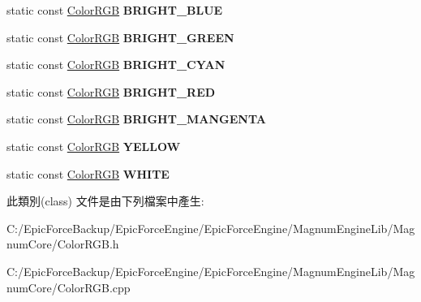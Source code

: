 \begin{DoxyCompactItemize}
\item 
static const \hyperlink{class_magnum_1_1_color_r_g_b}{Color\+R\+GB} {\bfseries B\+R\+I\+G\+H\+T\+\_\+\+B\+L\+UE}\hypertarget{class_magnum_1_1_color_r_g_b_a6963cc027e3faf280f7e26d610ee9c2c}{}\label{class_magnum_1_1_color_r_g_b_a6963cc027e3faf280f7e26d610ee9c2c}

\item 
static const \hyperlink{class_magnum_1_1_color_r_g_b}{Color\+R\+GB} {\bfseries B\+R\+I\+G\+H\+T\+\_\+\+G\+R\+E\+EN}\hypertarget{class_magnum_1_1_color_r_g_b_abf0acc88127121f7d3f23faf6164954d}{}\label{class_magnum_1_1_color_r_g_b_abf0acc88127121f7d3f23faf6164954d}

\item 
static const \hyperlink{class_magnum_1_1_color_r_g_b}{Color\+R\+GB} {\bfseries B\+R\+I\+G\+H\+T\+\_\+\+C\+Y\+AN}\hypertarget{class_magnum_1_1_color_r_g_b_aca190837015a9e2c805c86a6b8b94548}{}\label{class_magnum_1_1_color_r_g_b_aca190837015a9e2c805c86a6b8b94548}

\item 
static const \hyperlink{class_magnum_1_1_color_r_g_b}{Color\+R\+GB} {\bfseries B\+R\+I\+G\+H\+T\+\_\+\+R\+ED}\hypertarget{class_magnum_1_1_color_r_g_b_a0285b4b91cd28b7f32103416a2462807}{}\label{class_magnum_1_1_color_r_g_b_a0285b4b91cd28b7f32103416a2462807}

\item 
static const \hyperlink{class_magnum_1_1_color_r_g_b}{Color\+R\+GB} {\bfseries B\+R\+I\+G\+H\+T\+\_\+\+M\+A\+N\+G\+E\+N\+TA}\hypertarget{class_magnum_1_1_color_r_g_b_abd8bc1d6549782f2f5aca48c37c8e366}{}\label{class_magnum_1_1_color_r_g_b_abd8bc1d6549782f2f5aca48c37c8e366}

\item 
static const \hyperlink{class_magnum_1_1_color_r_g_b}{Color\+R\+GB} {\bfseries Y\+E\+L\+L\+OW}\hypertarget{class_magnum_1_1_color_r_g_b_a9d1c294a272f2d0c4275492fbb6e5fb6}{}\label{class_magnum_1_1_color_r_g_b_a9d1c294a272f2d0c4275492fbb6e5fb6}

\item 
static const \hyperlink{class_magnum_1_1_color_r_g_b}{Color\+R\+GB} {\bfseries W\+H\+I\+TE}\hypertarget{class_magnum_1_1_color_r_g_b_a0303d32467754d1c04d4c5b7e1d2de1a}{}\label{class_magnum_1_1_color_r_g_b_a0303d32467754d1c04d4c5b7e1d2de1a}

\end{DoxyCompactItemize}


此類別(class) 文件是由下列檔案中產生\+:\begin{DoxyCompactItemize}
\item 
C\+:/\+Epic\+Force\+Backup/\+Epic\+Force\+Engine/\+Epic\+Force\+Engine/\+Magnum\+Engine\+Lib/\+Magnum\+Core/Color\+R\+G\+B.\+h\item 
C\+:/\+Epic\+Force\+Backup/\+Epic\+Force\+Engine/\+Epic\+Force\+Engine/\+Magnum\+Engine\+Lib/\+Magnum\+Core/Color\+R\+G\+B.\+cpp\end{DoxyCompactItemize}
